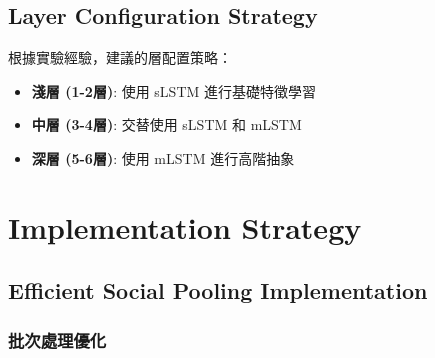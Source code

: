 \documentclass[11pt,a4paper]{article}
\begin{document}
\subsection{Layer Configuration Strategy}

根據實驗經驗，建議的層配置策略：
\begin{itemize}
\item \textbf{淺層 (1-2層)}: 使用 sLSTM 進行基礎特徵學習
\item \textbf{中層 (3-4層)}: 交替使用 sLSTM 和 mLSTM
\item \textbf{深層 (5-6層)}: 使用 mLSTM 進行高階抽象
\end{itemize}

\section{Implementation Strategy}

\subsection{Efficient Social Pooling Implementation}

\subsubsection{批次處理優化}
\end{document}
